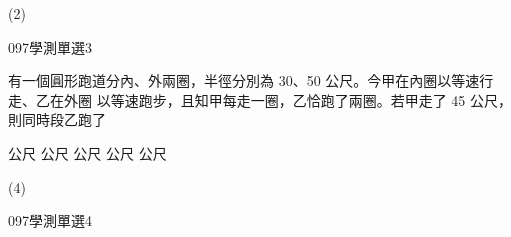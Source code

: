 \begin{QUESTIONS}
\begin{QUESTION}
\begin{QFROMS}
        \end{QFROMS}
        \begin{QTAGS}\end{QTAGS}
        \begin{QANS}
            (2)
        \end{QANS}
        \begin{QSOLLIST}
        \end{QSOLLIST}
        \begin{QEMPTYSPACE}
        \end{QEMPTYSPACE}
    \end{QUESTION}
    \begin{QUESTION}
        \begin{ExamInfo}{097}{學測}{單選}{3}
        \end{ExamInfo}
        \begin{ExamAnsRateInfo}{73}{97}{84}{38}
        \end{ExamAnsRateInfo}
        \begin{QBODY}
			有一個圓形跑道分內、外兩圈，半徑分別為 30、50 公尺。今甲在內圈以等速行走、乙在外圈 以等速跑步，且知甲每走一圈，乙恰跑了兩圈。若甲走了 45 公尺，則同時段乙跑了 \\
			\begin{QOPSINONELINE} 
				 公尺  公尺  公尺  公尺  公尺
			\end{QOPSINONELINE}
        \end{QBODY}
        \begin{QFROMS}
        \end{QFROMS}
        \begin{QTAGS}\end{QTAGS}
        \begin{QANS}
            (4)
        \end{QANS}
        \begin{QSOLLIST}
        \end{QSOLLIST}
        \begin{QEMPTYSPACE}
        \end{QEMPTYSPACE}
    \end{QUESTION}
    \begin{QUESTION}
        \begin{ExamInfo}{097}{學測}{單選}{4}
        \end{ExamInfo}
        \begin{ExamAnsRateInfo}{39}{69}{31}{17}
        \end{ExamAnsRateInfo}

\end{QUESTION}
\end{QUESTIONS}
